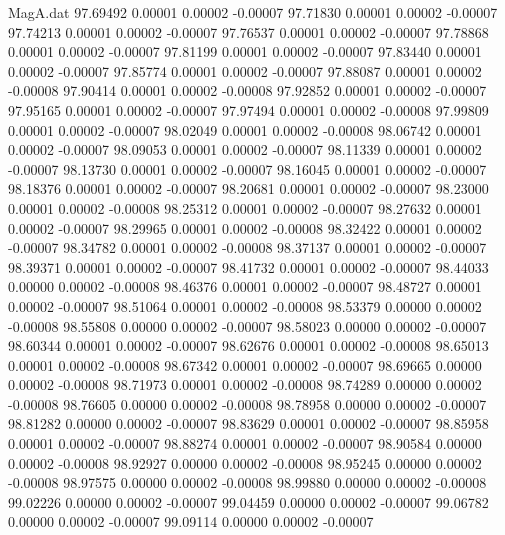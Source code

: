 \begin{filecontents}{MagA.dat}
  97.69492    0.00001    0.00002   -0.00007
  97.71830    0.00001    0.00002   -0.00007
  97.74213    0.00001    0.00002   -0.00007
  97.76537    0.00001    0.00002   -0.00007
  97.78868    0.00001    0.00002   -0.00007
  97.81199    0.00001    0.00002   -0.00007
  97.83440    0.00001    0.00002   -0.00007
  97.85774    0.00001    0.00002   -0.00007
  97.88087    0.00001    0.00002   -0.00008
  97.90414    0.00001    0.00002   -0.00008
  97.92852    0.00001    0.00002   -0.00007
  97.95165    0.00001    0.00002   -0.00007
  97.97494    0.00001    0.00002   -0.00008
  97.99809    0.00001    0.00002   -0.00007
  98.02049    0.00001    0.00002   -0.00008
  98.06742    0.00001    0.00002   -0.00007
  98.09053    0.00001    0.00002   -0.00007
  98.11339    0.00001    0.00002   -0.00007
  98.13730    0.00001    0.00002   -0.00007
  98.16045    0.00001    0.00002   -0.00007
  98.18376    0.00001    0.00002   -0.00007
  98.20681    0.00001    0.00002   -0.00007
  98.23000    0.00001    0.00002   -0.00008
  98.25312    0.00001    0.00002   -0.00007
  98.27632    0.00001    0.00002   -0.00007
  98.29965    0.00001    0.00002   -0.00008
  98.32422    0.00001    0.00002   -0.00007
  98.34782    0.00001    0.00002   -0.00008
  98.37137    0.00001    0.00002   -0.00007
  98.39371    0.00001    0.00002   -0.00007
  98.41732    0.00001    0.00002   -0.00007
  98.44033    0.00000    0.00002   -0.00008
  98.46376    0.00001    0.00002   -0.00007
  98.48727    0.00001    0.00002   -0.00007
  98.51064    0.00001    0.00002   -0.00008
  98.53379    0.00000    0.00002   -0.00008
  98.55808    0.00000    0.00002   -0.00007
  98.58023    0.00000    0.00002   -0.00007
  98.60344    0.00001    0.00002   -0.00007
  98.62676    0.00001    0.00002   -0.00008
  98.65013    0.00001    0.00002   -0.00008
  98.67342    0.00001    0.00002   -0.00007
  98.69665    0.00000    0.00002   -0.00008
  98.71973    0.00001    0.00002   -0.00008
  98.74289    0.00000    0.00002   -0.00008
  98.76605    0.00000    0.00002   -0.00008
  98.78958    0.00000    0.00002   -0.00007
  98.81282    0.00000    0.00002   -0.00007
  98.83629    0.00001    0.00002   -0.00007
  98.85958    0.00001    0.00002   -0.00007
  98.88274    0.00001    0.00002   -0.00007
  98.90584    0.00000    0.00002   -0.00008
  98.92927    0.00000    0.00002   -0.00008
  98.95245    0.00000    0.00002   -0.00008
  98.97575    0.00000    0.00002   -0.00008
  98.99880    0.00000    0.00002   -0.00008
  99.02226    0.00000    0.00002   -0.00007
  99.04459    0.00000    0.00002   -0.00007
  99.06782    0.00000    0.00002   -0.00007
  99.09114    0.00000    0.00002   -0.00007

\end{filecontents}
